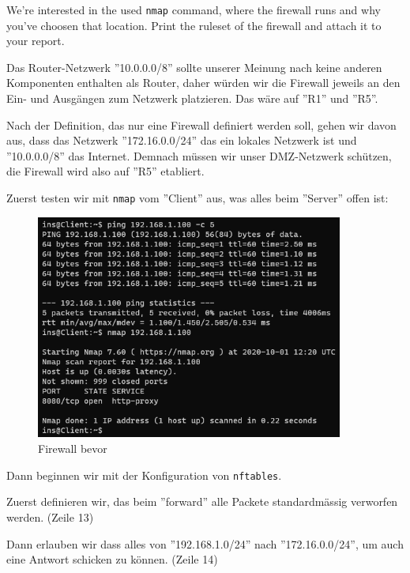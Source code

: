 \documentclass[11pt,titlepage]{article}
\newenvironment{shadedquotation}
 {\begin{shaded*}
  \quoting[leftmargin=0pt, vskip=0pt]
 }
 {\endquoting
 \end{shaded*}
}
\begin{document}
\begin{shadedquotation}
  We’re interested in the used \lstinline!nmap! command, where the firewall runs and why you’ve choosen that location. Print the ruleset of the firewall and attach it to your report.
\end{shadedquotation}

Das Router-Netzwerk ''10.0.0.0/8'' sollte unserer Meinung nach keine anderen Komponenten enthalten als Router, daher würden wir die Firewall jeweils an den Ein- und Ausgängen zum Netzwerk platzieren. Das wäre auf ''R1'' und ''R5''.
\par\medskip
Nach der Definition, das nur eine Firewall definiert werden soll, gehen wir davon aus, dass das Netzwerk ''172.16.0.0/24'' das ein lokales Netzwerk ist und ''10.0.0.0/8'' das Internet. Demnach müssen wir unser DMZ-Netzwerk schützen, die Firewall wird also auf ''R5'' etabliert.
\par\medskip

Zuerst testen wir mit \lstinline!nmap! vom ''Client'' aus, was alles beim ''Server'' offen ist:
\begin{figure}[H]
  \begin{center}
    \includegraphics[width=0.90\textwidth]{images/firewall-before.png}
    \caption{Firewall bevor}
    \label{fig:FirewallBefore}
  \end{center}
\end{figure}

Dann beginnen wir mit der Konfiguration von \lstinline!nftables!.

Zuerst definieren wir, das beim ''forward'' alle Packete standardmässig verworfen werden. (Zeile 13)

Dann erlauben wir dass alles von ''192.168.1.0/24'' nach ''172.16.0.0/24'', um auch eine Antwort schicken zu können. (Zeile 14)
\end{document}
